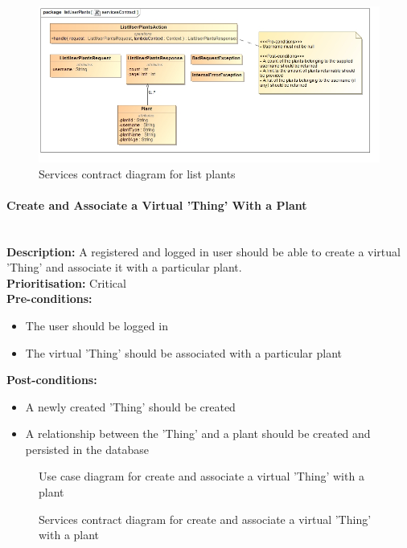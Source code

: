 \documentclass{article}
\begin{document}
		\begin{figure}[H]
			\includegraphics[width=\linewidth]{images/ServicesContracts/listUserPlants.jpg}
			\caption{Services contract diagram for list plants}
		\end{figure}
	
	\paragraph{Create and Associate a Virtual 'Thing' With a Plant}\mbox{}\\
		\textbf{Description:} A registered and logged in user should be able to create a virtual 'Thing' and associate it with a particular plant.\\
		\textbf{Prioritisation:} Critical\\		
		\textbf{Pre-conditions:}
			\begin{itemize}
				\item The user should be logged in
				\item The virtual 'Thing' should be associated with a particular plant
			\end{itemize}
		\textbf{Post-conditions:}
			\begin{itemize}
				\item A newly created 'Thing' should be created
				\item A relationship between the 'Thing' and a plant should be created and persisted in the database
			\end{itemize}

		\begin{figure}[H]
			\caption{Use case diagram for create and associate a virtual 'Thing' with a plant}
		\end{figure}
		
		\begin{figure}[H]
			\caption{Services contract diagram for create and associate a virtual 'Thing' with a plant}
		\end{figure}
		
\end{document}
